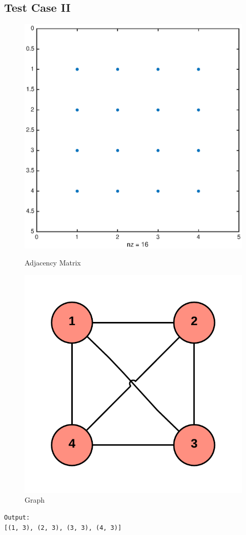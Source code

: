 \subsection{Test Case II}

\begin{figure}[H]
  \includegraphics[width=\linewidth]{spy2.eps}
  \caption{Adjacency Matrix}
\endminipage\hfill
{}
  \includegraphics[width=\linewidth]{graph2}
  \caption{Graph}
\endminipage
\end{figure}
\begin{verbatim}
Output:
[(1, 3), (2, 3), (3, 3), (4, 3)]
\end{verbatim}

